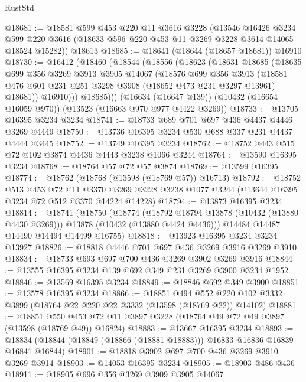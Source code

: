 \begin{lexlean}{RustStd}
\begin{coremodule}
@18681 := @18581
    @599
    @453
    @220
    @11
    @3616
    @3228
    (@13546
      @16426
      @3234
      @599
      @220
      @3616
      (@18633 @596 @220 @453 @11 @3269 @3228 @3614 @14065 @18524 @15282))
    @18613
@18685 := @18641 (@18644 (@18657 @18681)) @16910
@18730 := @16412
    (@18460
      (@18544
        (@18556
          (@18623
            (@18631
              @18685
              (@18635
                @699
                @356
                @3269
                @3913
                @3905
                @14067
                (@18576
                  @699
                  @356
                  @3913
                  (@18581 @476 @601 @231 @251 @3298 @3908 (@18652 @473 @231 @3297 @13961) @18681))
                @16910)))
          @18685)))
    (@16634 (@16647 @139))
    (@10432 (@16654 @16059 @970))
    (@13523 (@16663 @970 @977 @4422 @3269))
@18733 := @13705 @16395 @3234 @3234
@18741 := @18733 @689 @701 @697 @436 @4437 @4446 @3269 @4449
@18750 := @13736 @16395 @3234 @530 @688 @337 @231 @4437 @4444 @3445
@18752 := @13749 @16395 @3234
@18762 := @18752 @443 @515 @72 @102 @3874 @4436 @4443 @3238 @1066 @3244
@18764 := @13590 @16395 @3234
@18768 := @18764 @57 @72 @57 @3874
@18769 := @13599 @16395
@18774 := @18762 (@18768 (@13598 (@18769 @57)) @16713)
@18792 := @18752
    @513
    @453
    @72
    @11
    @3370
    @3269
    @3228
    @3238
    @1077
    @3244
    (@13644 @16395 @3234 @72 @512 @3370 @14224 @14228)
@18794 := @13873 @16395 @3234
@18814 := @18741
    (@18750
      (@18774
        (@18792 @18794 @13878 (@10432 (@13880 @4430 @3269)))
        @13878
        (@10432 (@13880 @4424 @4436)))
      @14484
      @14487
      @14490
      @14494
      @14499
      @16755)
@18818 := @13923 @16395 @3234 @3234 @13927
@18826 := @18818 @4446 @701 @697 @436 @3269 @3916 @3269 @3910
@18834 := @18733 @693 @697 @700 @436 @3269 @3902 @3269 @3916
@18844 := @13555 @16395 @3234 @139 @692 @349 @231 @3269 @3900 @3234 @1952
@18846 := @13569 @16395 @3234
@18849 := @18846 @692 @349 @3900
@18851 := @13578 @16395 @3234
@18866 := @18851
    @494
    @552
    @220
    @102
    @3332
    @3899
    (@18764 @22 @220 @22 @3332 (@13598 (@18769 @22)) @14102)
@18881 := @18851
    @550
    @453
    @72
    @11
    @3897
    @3228
    (@18764 @49 @72 @49 @3897 (@13598 (@18769 @49)) @16824)
@18883 := @13667 @16395 @3234
@18893 := @18834 (@18844 (@18849 (@18866 (@18881 @18883))) @16833 @16836 @16839 @16841 @16844)
@18901 := @18818 @3902 @697 @700 @436 @3269 @3910 @3269 @3914
@18903 := @14053 @16395 @3234
@18905 := @18903 @486 @436
@18911 := @18905 @696 @356 @3269 @3909 @3905 @14067

\end{coremodule}
\end{lexlean}
